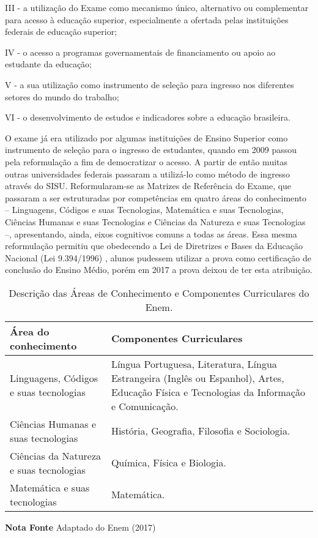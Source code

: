 	III - a utilização do Exame como mecanismo único, alternativo ou complementar para acesso à educação superior, especialmente a ofertada pelas instituições federais de educação superior;

	IV - o acesso a programas governamentais de financiamento ou apoio ao estudante da educação;

	V - a sua utilização como instrumento de seleção para ingresso nos diferentes setores do mundo do trabalho;

	VI - o desenvolvimento de estudos e indicadores sobre a educação brasileira. 

	O exame já era utilizado por algumas instituições de Ensino Superior como instrumento de seleção para o ingresso de estudantes, quando em 2009 passou pela reformulação a fim de democratizar o acesso. A partir de então muitas outras universidades federais passaram a utilizá-lo como método de ingresso através do SISU. Reformularam-se as Matrizes de Referência do Exame, que passaram a ser estruturadas por competências em quatro áreas do conhecimento – Linguagens, Códigos e suas Tecnologias, Matemática e suas Tecnologias, Ciências Humanas e suas Tecnologias e Ciências da Natureza e suas Tecnologias –, apresentando, ainda, eixos cognitivos comuns a todas as áreas. Essa mesma reformulação permitiu que obedecendo a Lei de Diretrizes e Bases da Educação Nacional (Lei 9.394/1996) \nocite{educaccao1996lei}, alunos pudessem utilizar a prova como certificação de conclusão do Ensino Médio, porém em 2017 a prova deixou de ter esta atribuição.

	\begin{table}[]
	\caption { Descrição das Áreas de Conhecimento e Componentes Curriculares do Enem.} 
	\begin{tabular}{|l|p{8 cm}|}
	\hline
	Área do conhecimento & Componentes Curriculares \\ \hline
	Linguagens, Códigos e suas tecnologias     &   Língua Portuguesa, Literatura, Língua Estrangeira (Inglês ou Espanhol), Artes, Educação Física e Tecnologias da Informação e Comunicação.\\
		        Ciências Humanas e suas tecnologias                           &     História, Geografia, Filosofia e Sociologia. \\
		         Ciências da Natureza e suas tecnologias                           &     Química, Física e Biologia.  \\
		         Matemática e suas tecnologias  & Matemática. \\                                        \hline
	\end{tabular}
	\begin{tablenotes}
	      \small
	      \item \textbf{Nota Fonte}  Adaptado do Enem (2017)
	    \end{tablenotes}
	\end{table}

